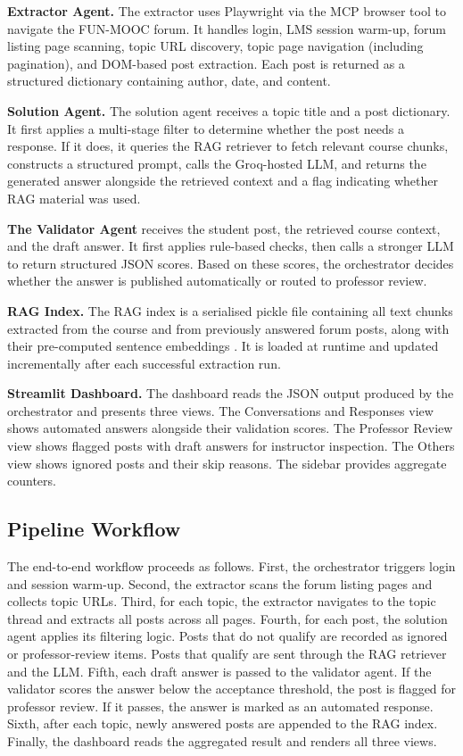 \documentclass[12pt, a4paper]{article}
\begin{document}
\textbf{Extractor Agent.} The extractor uses Playwright \cite{playwright2024} via the MCP browser tool to navigate the FUN-MOOC forum. It handles login, LMS session warm-up, forum listing page scanning, topic URL discovery, topic page navigation (including pagination), and DOM-based post extraction. Each post is returned as a structured dictionary containing author, date, and content.

\textbf{Solution Agent.} The solution agent receives a topic title and a post dictionary. It first applies a multi-stage filter to determine whether the post needs a response. If it does, it queries the RAG retriever to fetch relevant course chunks, constructs a structured prompt, calls the Groq-hosted LLM, and returns the generated answer alongside the retrieved context and a flag indicating whether RAG material was used.

\textbf{The Validator Agent} receives the student post, the retrieved course context, and the draft answer. It first applies rule-based checks, then calls a stronger LLM to return structured JSON scores. Based on these scores, the orchestrator decides whether the answer is published automatically or routed to professor review.

\textbf{RAG Index.} The RAG index is a serialised pickle file containing all text chunks extracted from the course and from previously answered forum posts, along with their pre-computed sentence embeddings \cite{reimers2020multilingual}. It is loaded at runtime and updated incrementally after each successful extraction run.

\textbf{Streamlit Dashboard.} The dashboard reads the JSON output produced by the orchestrator and presents three views. The Conversations and Responses view shows automated answers alongside their validation scores. The Professor Review view shows flagged posts with draft answers for instructor inspection. The Others view shows ignored posts and their skip reasons. The sidebar provides aggregate counters.

\subsection{Pipeline Workflow}

The end-to-end workflow proceeds as follows. First, the orchestrator triggers login and session warm-up. Second, the extractor scans the forum listing pages and collects topic URLs. Third, for each topic, the extractor navigates to the topic thread and extracts all posts across all pages. Fourth, for each post, the solution agent applies its filtering logic. Posts that do not qualify are recorded as ignored or professor-review items. Posts that qualify are sent through the RAG retriever and the LLM. Fifth, each draft answer is passed to the validator agent. If the validator scores the answer below the acceptance threshold, the post is flagged for professor review. If it passes, the answer is marked as an automated response. Sixth, after each topic, newly answered posts are appended to the RAG index. Finally, the dashboard reads the aggregated result and renders all three views.
\end{document}
